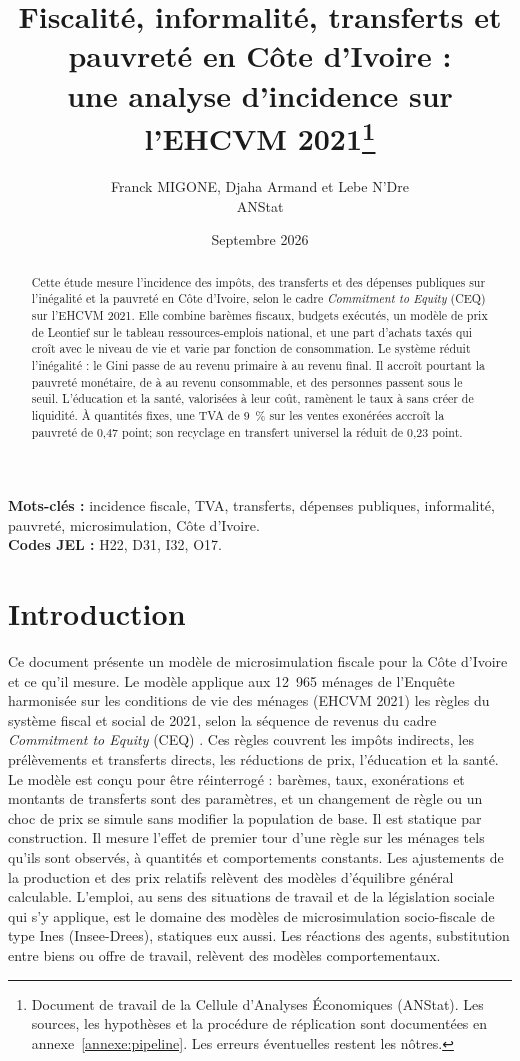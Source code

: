 \documentclass[11pt,a4paper]{article}
\title{\textbf{Fiscalité, informalité, transferts et pauvreté en Côte d'Ivoire :\\
une analyse d'incidence sur l'EHCVM 2021}\thanks{%
Document de travail de la Cellule d'Analyses Économiques (ANStat). Les sources,
les hypothèses et la procédure de réplication sont documentées en
annexe~\ref{annexe:pipeline}. Les erreurs éventuelles restent les nôtres.}}
\author{Franck MIGONE, Djaha Armand et Lebe N'Dre\\
\normalsize ANStat}
\date{Septembre 2026}
\begin{document}
\maketitle

\begin{abstract}
\noindent Cette étude mesure l'incidence des impôts, des transferts et des dépenses publiques sur l'inégalité et la pauvreté en Côte d'Ivoire, selon le cadre \emph{Commitment to Equity} (CEQ) sur l'EHCVM 2021. Elle combine barèmes fiscaux, budgets exécutés, un modèle de prix de Leontief sur le tableau ressources-emplois national, et une part d'achats taxés qui croît avec le niveau de vie et varie par fonction de consommation. Le système réduit l'inégalité : le Gini passe de \GiniPrimaire{} au revenu primaire à \GiniFinal{} au revenu final. Il accroît pourtant la pauvreté monétaire, de \PauvretePrimaire{} à \PauvreteConsommable{} au revenu consommable, et \PartNouveauxPauvres{} des personnes passent sous le seuil. L'éducation et la santé, valorisées à leur coût, ramènent le taux à \PauvreteFinale{} sans créer de liquidité. À quantités fixes, une TVA de 9~\% sur les ventes exonérées accroît la pauvreté de 0,47 point; son recyclage en transfert universel la réduit de 0,23 point.
\end{abstract}

\vspace{0.5em}
\noindent\textbf{Mots-clés :} incidence fiscale, TVA, transferts, dépenses
publiques, informalité, pauvreté, microsimulation, Côte d'Ivoire.\\
\textbf{Codes JEL :} H22, D31, I32, O17.

\newpage

\section{Introduction}
\label{sec:intro}

Ce document présente un modèle de microsimulation fiscale pour la Côte d'Ivoire et ce qu'il mesure. Le modèle applique aux 12~965 ménages de l'Enquête harmonisée sur les conditions de vie des ménages (EHCVM 2021) les règles du système fiscal et social de 2021, selon la séquence de revenus du cadre \emph{Commitment to Equity} (CEQ) \citep{lustig2022}. Ces règles couvrent les impôts indirects, les prélèvements et transferts directs, les réductions de prix, l'éducation et la santé. Le modèle est conçu pour être réinterrogé : barèmes, taux, exonérations et montants de transferts sont des paramètres, et un changement de règle ou un choc de prix se simule sans modifier la population de base. Il est statique par construction. Il mesure l'effet de premier tour d'une règle sur les ménages tels qu'ils sont observés, à quantités et comportements constants. Les ajustements de la production et des prix relatifs relèvent des modèles d'équilibre général calculable. L'emploi, au sens des situations de travail et de la législation sociale qui s'y applique, est le domaine des modèles de microsimulation socio-fiscale de type Ines (Insee-Drees), statiques eux aussi. Les réactions des agents, substitution entre biens ou offre de travail, relèvent des modèles comportementaux.
\end{document}
